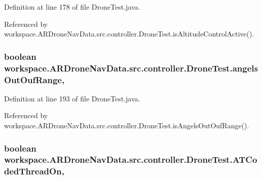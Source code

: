 Definition at line 178 of file Drone\+Test.\+java.



Referenced by workspace.\+A\+R\+Drone\+Nav\+Data.\+src.\+controller.\+Drone\+Test.\+is\+Altitude\+Control\+Active().

\hypertarget{classworkspace_1_1_a_r_drone_nav_data_1_1src_1_1controller_1_1_drone_test_a5c0d80cec0456eb59d236a40c1ffcdba}{}
\subsubsection[{angels\+Out\+Ouf\+Range}]{\setlength{\rightskip}{0pt plus 5cm}boolean workspace.\+A\+R\+Drone\+Nav\+Data.\+src.\+controller.\+Drone\+Test.\+angels\+Out\+Ouf\+Range\hspace{0.3cm}{\ttfamily [static]}, {\ttfamily [protected]}}\label{classworkspace_1_1_a_r_drone_nav_data_1_1src_1_1controller_1_1_drone_test_a5c0d80cec0456eb59d236a40c1ffcdba}


Definition at line 193 of file Drone\+Test.\+java.



Referenced by workspace.\+A\+R\+Drone\+Nav\+Data.\+src.\+controller.\+Drone\+Test.\+is\+Angels\+Out\+Ouf\+Range().

\hypertarget{classworkspace_1_1_a_r_drone_nav_data_1_1src_1_1controller_1_1_drone_test_a0dd789b3b30fefdbe5a98ce7078ef822}{}
\subsubsection[{A\+T\+Coded\+Thread\+On}]{\setlength{\rightskip}{0pt plus 5cm}boolean workspace.\+A\+R\+Drone\+Nav\+Data.\+src.\+controller.\+Drone\+Test.\+A\+T\+Coded\+Thread\+On\hspace{0.3cm}{\ttfamily [static]}, {\ttfamily [protected]}}\label{classworkspace_1_1_a_r_drone_nav_data_1_1src_1_1controller_1_1_drone_test_a0dd789b3b30fefdbe5a98ce7078ef822}



